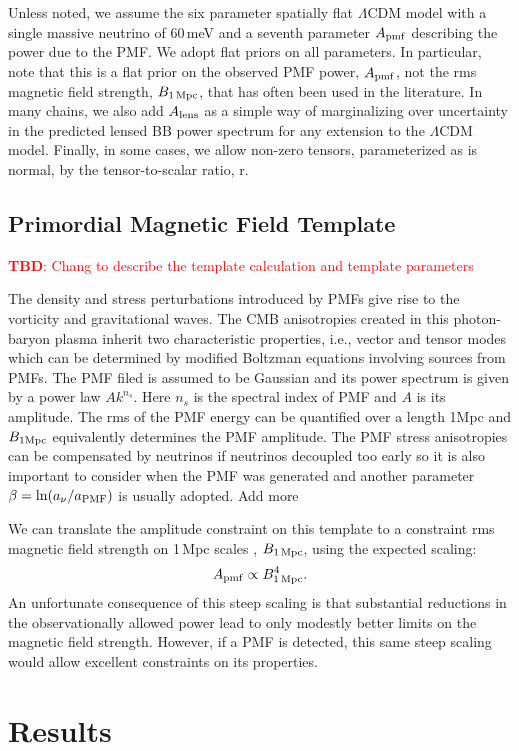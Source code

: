 \documentclass[preprint]{emulateapj}
\newcommand{\apmf}{\ensuremath{A_{\rm pmf}}}
\newcommand{\bpmf}{\ensuremath{B_{\rm 1\,Mpc}}}
\newcommand{\alens}{\ensuremath{A_{\rm lens}}}
\newcommand{\lcdm}{\ensuremath{\Lambda}CDM}
\newcommand{\be}{\begin{equation}}
\newcommand{\ee}{\end{equation}}
\newcommand{\tbd}[1]{\textcolor{Red}{{\bf TBD}: #1}}
\begin{document}
Unless noted, we assume the six parameter spatially flat \lcdm{} model with a single massive neutrino of 60\,meV and a seventh parameter \apmf{} describing the power due to the PMF. 
We adopt flat priors on all parameters. 
In particular, note that this is a flat prior on the observed PMF power, $\apmf$, not the rms magnetic field strength, \bpmf, that has often been used in the literature. 
In many chains, we also add \alens{} as a simple way of marginalizing over uncertainty in the predicted lensed BB power spectrum for any extension to the \lcdm{} model. 
Finally, in some cases, we allow non-zero tensors, parameterized as is normal, by the tensor-to-scalar ratio, r. 

\subsection{Primordial Magnetic Field Template}

\tbd{Chang to describe the template calculation and template parameters}

The density and stress perturbations introduced by PMFs give rise to the vorticity and gravitational waves. The CMB anisotropies created in this photon-baryon plasma inherit two characteristic properties, i.e., vector and tensor modes which can be determined by modified Boltzman equations involving sources from PMFs. The PMF filed is assumed to be Gaussian and its power spectrum is given by a power law $Ak^{n_s}$. Here $n_s$ is the spectral index of PMF and $A$ is its amplitude. The rms of the PMF energy can be quantified over a length 1\rm{Mpc} and $B_{\rm{1Mpc}}$ equivalently determines the PMF amplitude. The PMF stress anisotropies can be compensated by neutrinos if neutrinos decoupled too early so it is also important to consider when the PMF was generated and another parameter $\beta=\ln(a_{\nu}/a_{\rm{PMF}})$ is usually adopted. Add more 


We can translate the amplitude constraint on this template to a constraint rms magnetic field strength on 1\,Mpc scales , \bpmf, using the expected scaling:
\be
\apmf \propto \bpmf^4.
\ee
An unfortunate consequence of this steep scaling is that substantial reductions in the observationally allowed power lead to only modestly better limits on the magnetic field strength. 
However, if a PMF is detected, this same steep scaling would allow excellent constraints on its properties. 
 
\section{Results}
\label{sec:results}
\end{document}

